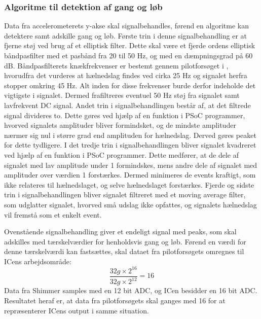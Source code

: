 \subsubsection{Algoritme til detektion af gang og løb}
Data fra accelerometerets y-akse skal signalbehandles, førend en algoritme kan detektere samt adskille gang og løb. Første trin i denne signalbehandling er at fjerne støj ved brug af et elliptisk filter. Dette skal være et fjerde ordens elliptisk båndpasfilter med et pasbånd fra 20 til 50 Hz, og med en dæmpningsgrad på 60 dB. Båndpasfilterets knækfrekvenser er bestemt gennem pilotforsøget i , hvorudfra det vurderes at hælnedslag findes ved cirka 25 Hz og signalet herfra stopper omkring 45 Hz. Alt inden for disse frekvenser burde derfor indeholde det vigtigste i signalet. Dermed frafiltreres eventuel 50 Hz støj fra signalet samt lavfrekvent DC signal. %
Andet trin i signalbehandlingen består af, at det filtrede signal divideres to. Dette gøres ved hjælp af en funktion i PSoC programmer, hvorved signalets amplituder bliver formindsket, og de mindste amplituder nærmer sig nul i større grad end amplituden for hælnedslag. Derved gøres peaket for dette tydligere. I det tredje trin i signalbehandlingen bliver signalet kvadreret ved hjælp af en funktion i PSoC programmer. Dette medfører, at de dele af signalet med lav amplitude under 1 formindskes, mens andre dele af signalet med amplituder over værdien 1 forstærkes. Dermed minimeres de events kraftigt, som ikke relateres til hælnedslaget, og selve hælnedslaget forstærkes. Fjerde og sidste trin i signalbehandlingen bliver signalet filtreret med et moving average filter, som udglatter signalet, hvorved små udslag ikke opfattes, og signalets hælnedslag vil fremstå som et enkelt event.

Ovenstående signalbehandling giver et endeligt signal med peaks, som skal adskilles med tærskelværdier for henholdsvis gang og løb. Førend en værdi for denne tærskelværdi kan fastsættes, skal dataet fra pilotforsøgets omregnes til ICens arbejdsområde: 
\begin{equation}
\frac{32 g \times 2^{16}}{32 g \times 2^{12}} = 16
\label{eq:bitsammenhaeng}
\end{equation}
Data fra Shimmer samples med en 12 bit ADC, og ICen besidder en 16 bit ADC. Resultatet heraf er, at data fra pilotforsøgets skal ganges med 16 for at repræsenterer ICens output i samme situation.

